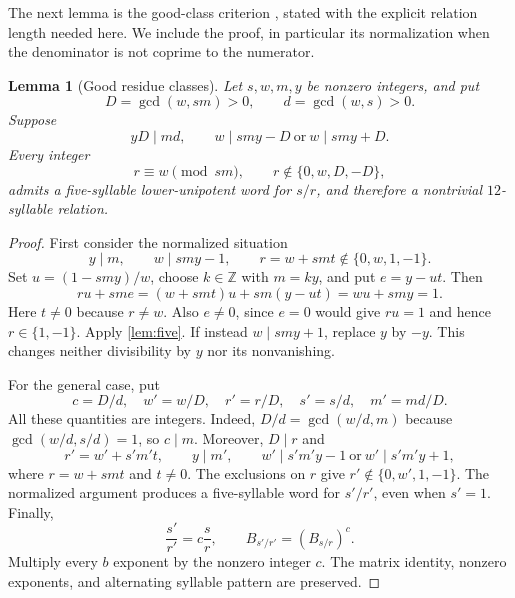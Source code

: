 \documentclass[11pt]{article}
\newtheorem{lemma}[theorem]{Lemma}
\theoremstyle{definition}
\theoremstyle{remark}
\numberwithin{equation}{section}
\newcommand{\Z}{\mathbb Z}
\begin{document}
The next lemma is the good-class criterion
\cite[Definition~3.3 and Lemma~3.5]{KK2020}, stated with the
explicit relation length needed here. We include the proof, in
particular its normalization when the denominator is not coprime
to the numerator.

\begin{lemma}[Good residue classes]\label{lem:good}
Let $s,w,m,y$ be nonzero integers, and put
\[
 D=\gcd(w,sm)>0,\qquad d=\gcd(w,s)>0.
\]
Suppose
\begin{equation}\label{eq:goodconditions}
 yD\mid md,\qquad w\mid smy-D\ \text{or}\ w\mid smy+D.
\end{equation}
Every integer
\[
 r\equiv w\pmod{sm},\qquad r\notin\{0,w,D,-D\},
\]
admits a five-syllable lower-unipotent word for $s/r$, and therefore
a nontrivial $12$-syllable relation.
\end{lemma}
\begin{proof}
First consider the normalized situation
\[
 y\mid m,\qquad w\mid smy-1,\qquad
 r=w+smt\notin\{0,w,1,-1\}.
\]
Set $u=(1-smy)/w$, choose $k\in\Z$ with $m=ky$, and put
$e=y-ut$. Then
\[
 ru+sme=(w+smt)u+sm(y-ut)=wu+smy=1.
\]
Here $t\ne0$ because $r\ne w$. Also $e\ne0$, since $e=0$
would give $ru=1$ and hence $r\in\{1,-1\}$. Apply
\cref{lem:five}. If instead $w\mid smy+1$, replace $y$ by $-y$.
This changes neither divisibility by $y$ nor its nonvanishing.

For the general case, put
\[
 c=D/d,\quad w'=w/D,\quad r'=r/D,\quad
 s'=s/d,\quad m'=md/D.
\]
All these quantities are integers. Indeed,
$D/d=\gcd(w/d,m)$ because $\gcd(w/d,s/d)=1$, so $c\mid m$.
Moreover, $D\mid r$ and
\[
 r'=w'+s'm't,\qquad y\mid m',\qquad
 w'\mid s'm'y-1\ \text{or}\ w'\mid s'm'y+1,
\]
where $r=w+smt$ and $t\ne0$. The exclusions on $r$ give
$r'\notin\{0,w',1,-1\}$. The normalized argument produces a
five-syllable word for $s'/r'$, even when $s'=1$.
Finally,
\[
 \frac{s'}{r'}=c\frac sr,\qquad B_{s'/r'}=(B_{s/r})^c.
\]
Multiply every $b$ exponent by the nonzero integer $c$.
The matrix identity, nonzero exponents, and alternating syllable
pattern are preserved.
\end{proof}
\end{document}
